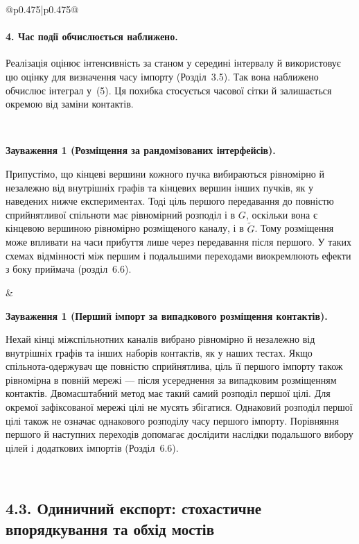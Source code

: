\documentclass[11pt]{article}
\begin{document}
\begin{longtable}{@{}p{0.475\textwidth}|p{0.475\textwidth}@{}}
\begin{minipage}[t]{\linewidth}
\paragraph{4. Час події обчислюється наближено.}
Реалізація оцінює інтенсивність за станом у середині інтервалу й використовує цю оцінку для визначення часу імпорту (Розділ~3.5). Так вона наближено обчислює інтеграл у~(5). Ця похибка стосується часової сітки й залишається окремою від заміни контактів.
\end{minipage} \\[5mm]
\begin{minipage}[t]{\linewidth}
\par\noindent\textbf{Зауваження 1 (Розміщення за рандомізованих інтерфейсів).}\par\noindent 
Припустімо, що кінцеві вершини кожного пучка вибираються рівномірно й незалежно від внутрішніх графів та кінцевих вершин інших пучків, як у наведених нижче експериментах. Тоді ціль першого передавання до повністю сприйнятливої спільноти має рівномірний розподіл і в $G$, оскільки вона є кінцевою вершиною рівномірно розміщеного каналу, і в $\tilde G$. Тому розміщення може впливати на часи прибуття лише через передавання після першого. У таких схемах відмінності між першим і подальшими переходами виокремлюють ефекти з боку приймача (розділ~6.6).
\par
\end{minipage} &
\begin{minipage}[t]{\linewidth}
\par\noindent\textbf{Зауваження 1 (Перший імпорт за випадкового розміщення контактів).}\par\noindent 
Нехай кінці міжспільнотних каналів вибрано рівномірно й незалежно від внутрішніх графів та інших наборів контактів, як у наших тестах. Якщо спільнота-одержувач ще повністю сприйнятлива, ціль її першого імпорту також рівномірна в повній мережі --- після усереднення за випадковим розміщенням контактів. Двомасштабний метод має такий самий розподіл першої цілі. Для окремої зафіксованої мережі цілі не мусять збігатися. Однаковий розподіл першої цілі також не означає однакового розподілу часу першого імпорту. Порівняння першого й наступних переходів допомагає дослідити наслідки подальшого вибору цілей і додаткових імпортів (Розділ~6.6).
\par
\end{minipage} \\[5mm]
\begin{minipage}[t]{\linewidth}
\subsection*{4.3. Одиничний експорт: стохастичне впорядкування та обхід мостів}


\end{minipage}
\end{longtable}
\end{document}
